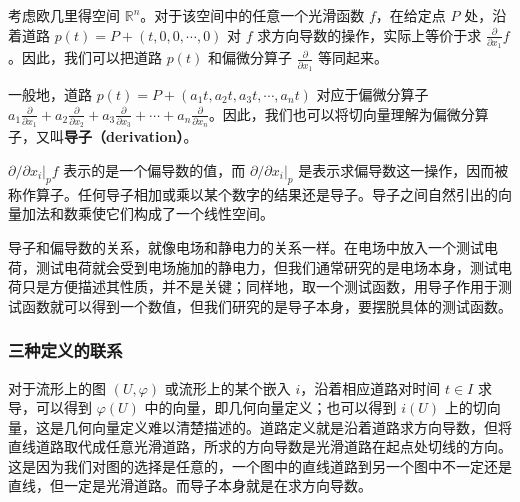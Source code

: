 考虑欧几里得空间 $\mathbb{R}^n$。对于该空间中的任意一个光滑函数 $f$，在给定点 $P$ 处，沿着道路 $p(t)=P+(t, 0, 0, \cdots, 0)$ 对 $f$ 求方向导数的操作，实际上等价于求 $\frac{\partial}{\partial x_1}f$。因此，我们可以把道路 $p(t)$ 和偏微分算子 $\frac{\partial}{\partial x_1}$ 等同起来。

一般地，道路 $p(t)=P+(a_1t, a_2t, a_3t, \cdots, a_nt)$ 对应于偏微分算子 $a_1\frac{\partial}{\partial x_1}+a_2\frac{\partial}{\partial x_2}+a_3\frac{\partial}{\partial x_3}+\cdots+a_n\frac{\partial}{\partial x_n}$。因此，我们也可以将切向量理解为偏微分算子，又叫\textbf{导子（derivation）}。





$\partial/\partial x_i|_{p}f$ 表示的是一个偏导数的值，而 $\partial/\partial x_i|_{p}$ 是表示求偏导数这一操作，因而被称作算子。任何导子相加或乘以某个数字的结果还是导子。导子之间自然引出的向量加法和数乘使它们构成了一个线性空间。

导子和偏导数的关系，就像电场和静电力的关系一样。在电场中放入一个测试电荷，测试电荷就会受到电场施加的静电力，但我们通常研究的是电场本身，测试电荷只是方便描述其性质，并不是关键；同样地，取一个测试函数，用导子作用于测试函数就可以得到一个数值，但我们研究的是导子本身，要摆脱具体的测试函数。


\subsubsection{三种定义的联系}

对于流形上的图 $(U,\varphi)$ 或流形上的某个嵌入 $i$，沿着相应道路对时间 $t\in I$ 求导，可以得到 $\varphi(U)$ 中的向量，即几何向量定义；也可以得到 $i(U)$ 上的切向量，这是几何向量定义难以清楚描述的。道路定义就是沿着道路求方向导数，但将直线道路取代成任意光滑道路，所求的方向导数是光滑道路在起点处切线的方向。这是因为我们对图的选择是任意的，一个图中的直线道路到另一个图中不一定还是直线，但一定是光滑道路。而导子本身就是在求方向导数。

